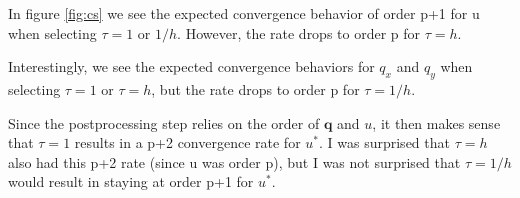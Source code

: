 \documentclass{article}
\begin{document}

In figure \ref{fig:cs} we see the expected convergence behavior of order p+1 for u when selecting $\tau = 1$ or $1/h$.
However, the rate drops to order p for $\tau = h$.

Interestingly, we see the expected convergence behaviors for $q_x$ and $q_y$ when selecting $\tau = 1$ or $\tau = h$, but the rate drops to order p for $\tau = 1/h$.

Since the postprocessing step relies on the order of $\mathbf{q}$ and $u$, it then makes sense that $\tau = 1$ results in a p+2 convergence rate for $u^*$. I was surprised that $\tau = h$ also had this p+2 rate (since u was order p), but I was not surprised that $\tau = 1/h$ would result in staying at order p+1 for $u^*$.
\end{document}
